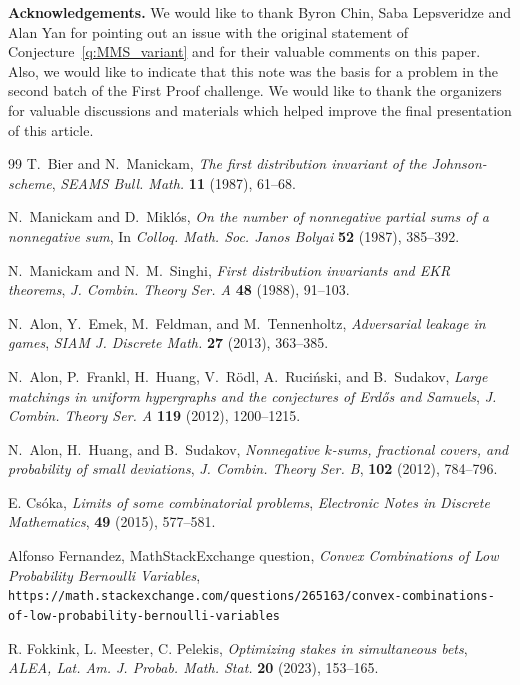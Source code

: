 \documentclass[11pt]{amsart}
\theoremstyle{definition}
\begin{document}
\medskip
\noindent
\textbf{Acknowledgements.} We would like to thank Byron Chin, Saba Lepsveridze and Alan Yan for pointing out an issue with the original statement of Conjecture~\ref{q:MMS_variant} and for their valuable comments on this paper. Also, we would like to indicate that this note was the basis for a problem in the second batch of the First Proof challenge. We would like to thank the organizers for valuable discussions and materials which helped improve the final presentation of this article.

\begin{thebibliography}{99}
T.~Bier and N.~Manickam,
\emph{The first distribution invariant of the Johnson-scheme},
\emph{SEAMS Bull. Math.} \textbf{11} (1987), 61--68.

N.~Manickam and D.~Mikl\'os,
\emph{On the number of nonnegative partial sums of a nonnegative sum},
In \emph{Colloq. Math. Soc. Janos Bolyai} \textbf{52} (1987), 385--392.

N.~Manickam and N.~M.~Singhi,
\emph{First distribution invariants and EKR theorems},
\emph{J. Combin. Theory Ser. A} \textbf{48} (1988), 91--103.

N.~Alon, Y.~Emek, M.~Feldman, and M.~Tennenholtz,
\emph{Adversarial leakage in games},
\emph{SIAM J. Discrete Math.} \textbf{27} (2013), 363--385.

N.~Alon, P.~Frankl, H.~Huang, V.~R\"odl, A.~Ruci\'nski, and B.~Sudakov,
\emph{Large matchings in uniform hypergraphs and the conjectures of Erd\H{o}s and Samuels},
\emph{J. Combin. Theory Ser. A} \textbf{119} (2012), 1200--1215.

N.~Alon, H.~Huang, and B.~Sudakov,
\emph{Nonnegative $k$-sums, fractional covers, and probability of small deviations},
\emph{J. Combin. Theory Ser. B}, \textbf{102} (2012), 784--796.

 E. Cs\'oka,
\emph{Limits of some combinatorial problems},
\emph{Electronic Notes in Discrete Mathematics}, \textbf{49} (2015), 577--581.

 Alfonso Fernandez, MathStackExchange question, \emph{Convex Combinations of Low Probability Bernoulli Variables}, {\tt https://math.stackexchange.com/questions/265163/convex-combinations-of-low-probability-bernoulli-variables}

 R. Fokkink, L. Meester, C. Pelekis,
\emph{Optimizing stakes in simultaneous bets},
\emph{ALEA, Lat. Am. J. Probab. Math. Stat.} \textbf{20} (2023), 153--165.


\end{thebibliography}
\end{document}
